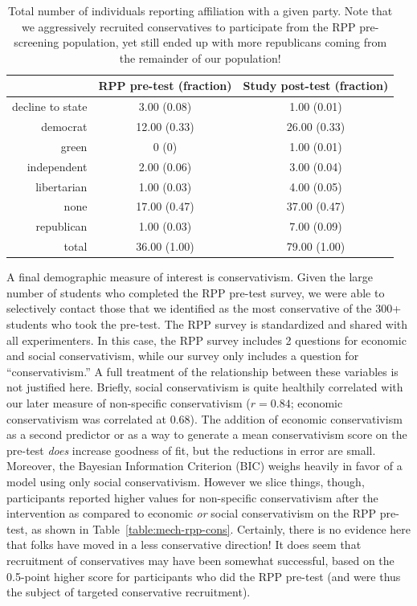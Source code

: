 \begin{table}[ht]
    \caption{Total number of individuals reporting affiliation with a given
        party. Note that we aggressively recruited conservatives to participate
        from the RPP pre-screening population, yet still ended up with more
        republicans coming from the remainder of our population!}
    \label{table:mech-rpp-party-affiliations}
\centering
\begin{tabular}{rcc}
  \toprule
 & RPP pre-test (fraction) & Study post-test (fraction) \\ 
  \midrule
  decline to state & 3.00 (0.08) & 1.00 (0.01) \\ 
  democrat & 12.00 (0.33) & 26.00 (0.33) \\ 
  green & 0 (0) & 1.00 (0.01) \\ 
  independent & 2.00 (0.06) & 3.00 (0.04) \\ 
  libertarian & 1.00 (0.03) & 4.00 (0.05) \\ 
  none & 17.00 (0.47) & 37.00 (0.47) \\ 
  republican & 1.00 (0.03) & 7.00 (0.09) \\ 
  \midrule
  total & 36.00 (1.00) & 79.00 (1.00) \\ 
   \bottomrule
\end{tabular}
\end{table}

A final demographic measure of interest is conservativism. Given the large
number of students who completed the RPP pre-test survey, we were able to
selectively contact those that we identified as the most conservative of the
300+ students who took the pre-test. The RPP survey is standardized and shared
with all experimenters. In this case, the RPP survey includes 2 questions for
economic and social conservativism, while our survey only includes a question
for “conservativism.” A full treatment of the relationship between these
variables is not justified here. Briefly, social conservativism is quite
healthily correlated with our later measure of non-specific conservativism ($r =
0.84$; economic conservativism was correlated at 0.68). The addition of economic
conservativism as a second predictor or as a way to generate a mean
conservativism score on the pre-test \emph{does} increase goodness of fit, but
the reductions in error are small. Moreover, the Bayesian Information Criterion
(BIC) weighs heavily in favor of a model using only social conservativism.
However we slice things, though, participants reported higher values for
non-specific conservativism after the intervention as compared to economic
\emph{or} social conservativism on the RPP pre-test, as shown in
Table~\ref{table:mech-rpp-cons}. Certainly, there is no evidence here that folks
have moved in a less conservative direction! It does seem that recruitment of
conservatives may have been somewhat successful, based on the 0.5-point higher
score for participants who did the RPP pre-test (and were thus the subject of
targeted conservative recruitment).

